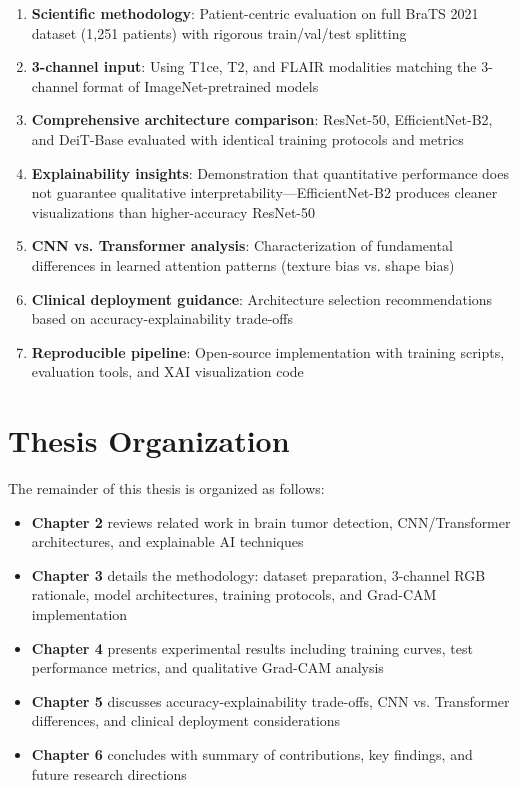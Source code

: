 \begin{enumerate}
    \item \textbf{Scientific methodology}: Patient-centric evaluation on full BraTS 2021 dataset (1,251 patients) with rigorous train/val/test splitting
    
    \item \textbf{3-channel input}: Using T1ce, T2, and FLAIR modalities matching the 3-channel format of ImageNet-pretrained models
    
    \item \textbf{Comprehensive architecture comparison}: ResNet-50, EfficientNet-B2, and DeiT-Base evaluated with identical training protocols and metrics
    
    \item \textbf{Explainability insights}: Demonstration that quantitative performance does not guarantee qualitative interpretability---EfficientNet-B2 produces cleaner visualizations than higher-accuracy ResNet-50
    
    \item \textbf{CNN vs. Transformer analysis}: Characterization of fundamental differences in learned attention patterns (texture bias vs. shape bias)
    
    \item \textbf{Clinical deployment guidance}: Architecture selection recommendations based on accuracy-explainability trade-offs
    
    \item \textbf{Reproducible pipeline}: Open-source implementation with training scripts, evaluation tools, and XAI visualization code
\end{enumerate}

\section{Thesis Organization}

The remainder of this thesis is organized as follows:

\begin{itemize}
    \item \textbf{Chapter 2} reviews related work in brain tumor detection, CNN/Transformer architectures, and explainable AI techniques
    \item \textbf{Chapter 3} details the methodology: dataset preparation, 3-channel RGB rationale, model architectures, training protocols, and Grad-CAM implementation
    \item \textbf{Chapter 4} presents experimental results including training curves, test performance metrics, and qualitative Grad-CAM analysis
    \item \textbf{Chapter 5} discusses accuracy-explainability trade-offs, CNN vs. Transformer differences, and clinical deployment considerations
    \item \textbf{Chapter 6} concludes with summary of contributions, key findings, and future research directions
\end{itemize}
